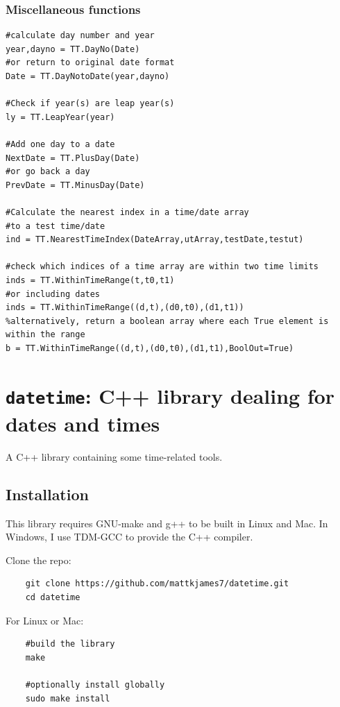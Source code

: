 \subsubsection{Miscellaneous functions}

\begin{verbatim}
#calculate day number and year
year,dayno = TT.DayNo(Date)
#or return to original date format
Date = TT.DayNotoDate(year,dayno)

#Check if year(s) are leap year(s)
ly = TT.LeapYear(year)

#Add one day to a date
NextDate = TT.PlusDay(Date)
#or go back a day
PrevDate = TT.MinusDay(Date)

#Calculate the nearest index in a time/date array
#to a test time/date
ind = TT.NearestTimeIndex(DateArray,utArray,testDate,testut)

#check which indices of a time array are within two time limits
inds = TT.WithinTimeRange(t,t0,t1)
#or including dates
inds = TT.WithinTimeRange((d,t),(d0,t0),(d1,t1))
%alternatively, return a boolean array where each True element is within the range
b = TT.WithinTimeRange((d,t),(d0,t0),(d1,t1),BoolOut=True)
\end{verbatim}



	\section{\texttt{datetime}: C++ library dealing for dates and times}


	A C++ library containing some time-related tools.
	
	\subsection{Installation}
	
	This library requires GNU-make and g++ to be built in Linux and Mac. In Windows, I use TDM-GCC to provide the C++ compiler.
	
	Clone the repo:
	
	\begin{verbatim}
	git clone https://github.com/mattkjames7/datetime.git
	cd datetime
	\end{verbatim}
	
	For Linux or Mac:
	\begin{verbatim}
	#build the library
	make
	
	#optionally install globally
	sudo make install
	\end{verbatim}
	
